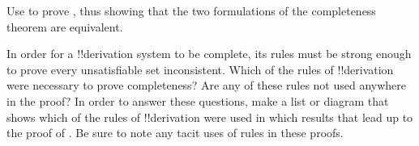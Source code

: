\documentclass[../../../include/open-logic-section]{subfiles}
\begin{document}
\begin{prob}
Use  to prove
, thus showing that the two
formulations of the completeness theorem are equivalent.
\end{prob}

\begin{prob}
In order for a !!{derivation} system to be complete, its rules must be
strong enough to prove every unsatisfiable set inconsistent.  Which of
the rules of !!{derivation} were necessary to prove completeness?  Are any
of these rules not used anywhere in the proof?  In order to answer
these questions, make a list or diagram that shows which of the rules
of !!{derivation} were used in which results that lead up to the proof of
.  Be sure to note any tacit
uses of rules in these proofs.
\end{prob}
\end{document}
